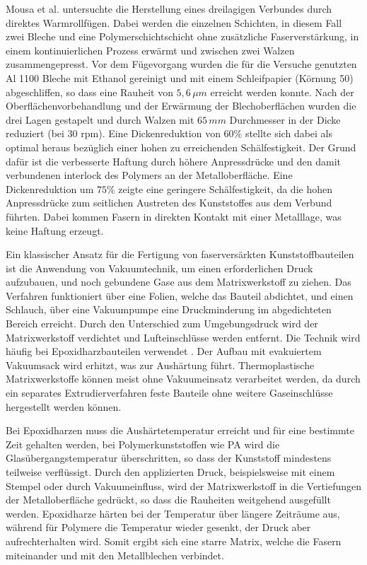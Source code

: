 Mousa et al. \cite{Mousa.2017} untersuchte die Herstellung eines dreilagigen Verbundes durch direktes Warmrollfügen.
Dabei werden die einzelnen Schichten, in diesem Fall zwei Bleche und eine Polymerschichtschicht ohne zusätzliche Faserverstärkung, in einem kontinuierlichen Prozess erwärmt und zwischen zwei Walzen zusammengepresst.
Vor dem Fügevorgang wurden die für die Versuche genutzten Al 1100 Bleche mit Ethanol gereinigt und mit einem Schleifpapier (Körnung 50) abgeschliffen, so dass eine Rauheit von $5,6\, \mu m$ erreicht werden konnte.
Nach der Oberflächenvorbehandlung und der Erwärmung der Blechoberflächen wurden die drei Lagen gestapelt und durch Walzen mit $65\, mm$ Durchmesser in der Dicke reduziert (bei 30 rpm).
Eine Dickenreduktion von $60 \%$ stellte sich dabei als optimal heraus bezüglich einer hohen zu erreichenden Schälfestigkeit.
Der Grund dafür ist die verbesserte Haftung durch höhere Anpressdrücke und den damit verbundenen interlock des Polymers an der Metalloberfläche.
Eine Dickenreduktion um $75\%$ zeigte eine geringere Schälfestigkeit, da die hohen Anpressdrücke zum seitlichen Austreten des Kunststoffes aus dem Verbund führten.
Dabei kommen Fasern in direkten Kontakt mit einer Metalllage, was keine Haftung erzeugt.

Ein klassischer Ansatz für die Fertigung von faserversärkten Kunststoffbauteilen ist die Anwendung von Vakuumtechnik, um einen erforderlichen Druck aufzubauen, und noch gebundene Gase aus dem Matrixwerkstoff zu ziehen.
Das Verfahren funktioniert über eine Folien, welche das Bauteil abdichtet, und einen Schlauch, über eine Vakuumpumpe eine Druckminderung im abgedichteten Bereich erreicht.
Durch den Unterschied zum Umgebungsdruck wird der Matrixwerkstoff verdichtet und Lufteinschlüsse werden entfernt.
Die Technik wird häufig bei Epoxidharzbauteilen verwendet \cite{Bellini.2020}.
Der Aufbau mit evakuiertem Vakuumsack wird erhitzt, was zur Aushärtung führt.
Thermoplastische Matrixwerkstoffe können meist ohne Vakuumeinsatz verarbeitet werden, da durch ein separates Extrudierverfahren feste Bauteile ohne weitere Gaseinschlüsse hergestellt werden können.

Bei Epoxidharzen muss die Aushärtetemperatur erreicht und für eine bestimmte Zeit gehalten werden, bei Polymerkunststoffen wie PA wird die Glasübergangstemperatur überschritten, so dass der Kunststoff mindestens teilweise verflüssigt.
Durch den applizierten Druck, beispielsweise mit einem Stempel oder durch Vakuumeinfluss, wird der Matrixwerkstoff in die Vertiefungen der Metalloberfläche gedrückt, so dass die Rauheiten weitgehend ausgefüllt werden.
Epoxidharze härten bei der Temperatur über längere Zeiträume aus, während für Polymere die Temperatur wieder gesenkt, der Druck aber aufrechterhalten wird.
Somit ergibt sich eine starre Matrix, welche die Fasern miteinander und mit den Metallblechen verbindet. \cite{Sinmazcelik.2011}

